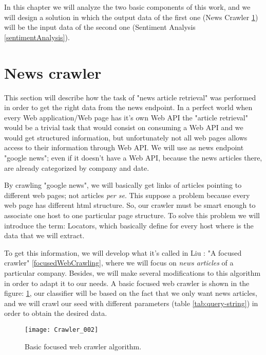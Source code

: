 In this chapter we will analyze the two basic components of this work, and we will design a solution in which the output data of the first one (News Crawler \ref{newsCrawler}) will be the input data of the second one (Sentiment Analysis \ref{sentimentAnalysis}).


\section{News crawler}\label{newsCrawler}

This section will describe how the task of "news article retrieval" was performed in order to get the right data from the \gls{news endpoint}.
In a perfect world when every Web application/Web page has it's own \gls{Web API} the "article retrieval" would be a trivial task that would consist on consuming a \gls{Web API} and we would get structured information, but unfortunately not all web pages allows access to their information through \gls{Web API}.
We will use as \gls{news endpoint} "google news"; even if it doesn't have a \gls{Web API}, because the news articles there, are already categorized by company and date.

By crawling "google news", we will basically get links of articles pointing to different web pages; not articles \emph{per se}. This suppose a problem because every web page has different html structure. So, our crawler must be smart enough to associate one host to one particular page structure. To solve this problem we will introduce the term: Locators, which basically define for every host where is the data that we will extract.

To get this information, we will develop what it's called in  Liu \cite[p. 312]{L2011}: "A focused crawler" \ref{focusedWebCrawling}, where we will focus on \emph{news articles} of a particular company. Besides, we will make several modifications to this algorithm in order to adapt it to our needs. A basic focused web crawler is shown in the figure: \ref{fig:Crawler_002}, our classifier will be based on the fact that we only want news articles, and we will crawl our seed with different parameters (table \ref{tab:query-string}) in order to obtain the desired data.

	\begin{figure}\centering
		\texttt{[image: Crawler\_002]}
		\caption{Basic focused web crawler algorithm.}\label{fig:Crawler_002}
	\end{figure}

